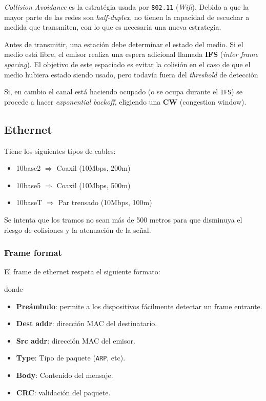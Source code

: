 \documentclass[]{article}
\begin{document}
\emph{Collision Avoidance} es la estratégia usada por \texttt{802.11} (\emph{Wifi}). Debido a que la mayor parte de las redes son \emph{half-duplex}, no tienen la capacidad de escuchar a medida que transmiten, con lo que es necesaria una nueva estrategia.

Antes de transmitir, una estación debe determinar el estado del medio. Si el medio está libre, el emisor realiza una espera adicional llamada \textbf{IFS} (\emph{inter frame spacing}). El objetivo de este espaciado es evitar la colisión en el caso de que el medio hubiera estado siendo usado, pero todavía fuera del \emph{threshold} de detección

Si, en cambio el canal está haciendo ocupado (o se ocupa durante el \texttt{IFS}) se procede a hacer \emph{exponential backoff}, eligiendo una \textbf{CW} (congestion window).



\subsection{Ethernet}
Tiene los siguientes tipos de cables:
\begin{itemize}
    \item 10base2 $\Rightarrow$ Coaxil (10Mbps, 200m)
    \item 10base5 $\Rightarrow$ Coaxil (10Mbps, 500m)
    \item 10baseT $\Rightarrow$ Par trensado (10Mbps, 100m)
\end{itemize}

Se intenta que los tramos no sean más de 500 metros para que disminuya el riesgo de colisiones y la atenuación de la señal.

\subsubsection{Frame format}
El frame de ethernet respeta el siguiente formato:

donde
\begin{itemize}
    \item \textbf{Preámbulo}: permite a los dispositivos fácilmente detectar un frame entrante.
    \item \textbf{Dest addr}: dirección MAC del destinatario.
    \item \textbf{Src addr}: dirección MAC del emisor.
    \item \textbf{Type}: Tipo de paquete (\texttt{ARP}, etc).
    \item \textbf{Body}: Contenido del mensaje.
    \item \textbf{CRC}: validación del paquete.
\end{itemize}
\end{document}
